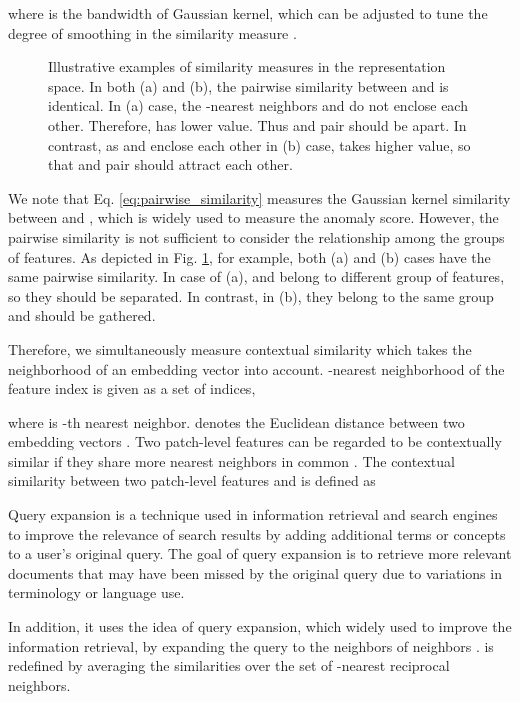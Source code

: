 \documentclass[10pt,onecolumn,letterpaper]{article}
\begin{document}
where  is the bandwidth of Gaussian kernel, which can be adjusted to tune the degree of smoothing in the similarity measure \cite{Kim2021embedding,kim2022self}.
\begin{figure}
\caption{Illustrative examples of similarity measures in the representation space. In both (a) and (b), the pairwise similarity  between  and  is identical.
In (a) case, the -nearest neighbors  and  do not enclose each other. Therefore,  has lower value. Thus  and  pair should be apart.
In contrast, as  and  enclose each other in (b) case,
 takes higher value, so that  and  pair should attract each other.}
\label{fig:num2}
\end{figure}
We note that Eq. \ref{eq:pairwise_similarity} measures the Gaussian kernel similarity between  and , which is widely used to measure the anomaly score.
However, the pairwise similarity is not sufficient to consider the relationship among the groups of features.
As depicted in Fig. \ref{fig:num2}, for example, both (a) and (b) cases have the same pairwise similarity. In case of (a),  and  belong to different group of features, so they should be separated. In contrast, in (b), they belong to the same group and should be gathered. 


Therefore, we simultaneously measure contextual similarity which takes the neighborhood of an embedding vector into account. -nearest neighborhood of the feature index  is given as a set of indices,

where  is -th nearest neighbor.  denotes the Euclidean distance between two embedding vectors . 
Two patch-level features can be regarded to be contextually similar if they share more nearest neighbors in common \cite{liao2022contextual}.
The contextual similarity  between two patch-level features  and  is defined as





Query expansion is a technique used in information retrieval and search engines to improve the relevance of search results by adding additional terms or concepts to a user's original query. The goal of query expansion is to retrieve more relevant documents that may have been missed by the original query due to variations in terminology or language use.

In addition, it uses the idea of query expansion, which widely used to improve the information retrieval, by expanding the query to the neighbors of neighbors \cite{kim2022self,liao2022contextual}.
 is redefined by averaging the similarities over the set of -nearest reciprocal neighbors.
\end{document}

